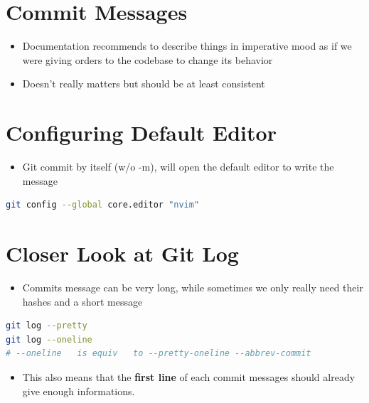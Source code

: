 \documentclass{report}
\begin{document}
\section{Commit Messages}

\begin{itemize}
	\item Documentation recommends to describe things in imperative mood as if we were giving orders to the codebase to change its behavior 
	\item Doesn't really matters but should be at least consistent
\end{itemize}


\section{Configuring Default Editor}
\begin{itemize}
	\item Git commit by itself (w/o -m), will open the default editor to write the message
\end{itemize}

\begin{tcolorbox}[title=Changing Editor,colback=backcolour]
\begin{lstlisting}[language=bash]
git config --global core.editor "nvim"
\end{lstlisting}
\end{tcolorbox}


\section{Closer Look at Git Log}
\begin{itemize}
	\item Commits message can be very long, while sometimes we only really need their hashes and a short message
\end{itemize}

\begin{tcolorbox}[title=Commit Formating,colback=backcolour]
\begin{lstlisting}[language=bash]
git log --pretty
git log --oneline 
# --oneline   is equiv   to --pretty-oneline --abbrev-commit
\end{lstlisting}
\end{tcolorbox}

\begin{itemize}
	\item This also means that the \textbf{first line} of each commit messages should already give enough informations. 
\end{itemize}
\end{document}
